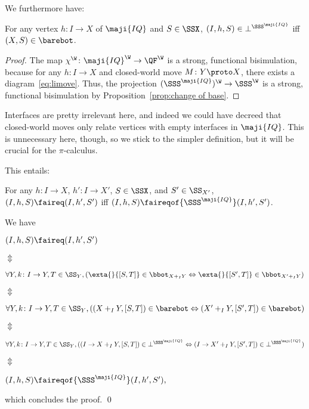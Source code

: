 \documentclass{LMCS}
\renewcommand{\QFI}{\maji{IQ}}
\renewcommand{\LLL}{\QFI}
\renewcommand{\SSSL}{\SSS^{\LLL}}
\theoremstyle{plain}\newtheorem{satz}[thm]{Satz}
\begin{document}
We furthermore have:
\begin{lem}\label{lem:barebat:botL}
  For any vertex $h \colon I \to X$ of $\LLL$ and
  $S \in \SSX$, $(I,h,S) \in \bot^{\SSSL}$ iff $(X,S) \in \barebot$.
\end{lem}
\begin{proof}
  The map $\chi^\W \colon \LLL^\W \to \QF^\W$ is a strong, functional bisimulation,
  because for any $h \colon I \to X$ and closed-world move $M \colon Y
  \proto X$, there exists a diagram~\eqref{eq:limove}.  Thus, the
  projection $(\SSSL)^\W \to \SSS^\W$ is a strong, functional bisimulation by
  Proposition~\ref{prop:change of base}.
\end{proof}
\begin{rem}
  Interfaces are pretty irrelevant here, and indeed we could have
  decreed that closed-world moves only relate vertices with empty
  interfaces in $\LLL$. This is unnecessary here, though, so we stick
  to the simpler definition, but it will be crucial for the
  $\pi$-calculus.
\end{rem}

This entails:
\begin{cor}\label{cor:SSSLI}
  For any $h \colon I \to X$, $h' \colon I \to X'$, $S \in \SSX$, and
  $S' \in \SS_{X'}$, $(I,h,S) \faireq (I,h',S')$ iff $(I,h,S)
  \faireqof{\SSSL} (I,h',S')$.
\end{cor}
\proof We have
  \begin{center}
    $(I,h,S) \faireq (I,h',S')$ 
    
      $\Updownarrow$

      $\forall Y, k \colon I \to Y, T \in \SS_Y, (\exta{}{[S,T]} \in \bbot_{X +_I Y} \Leftrightarrow
      \exta{}{[S',T]} \in \bbot_{X' +_I Y})$

      $\Updownarrow$

      $\forall Y, k \colon I \to Y, T \in \SS_Y, ((X +_I Y, {[S,T]}) \in \barebot \Leftrightarrow
      (X' +_I Y, {[S',T]}) \in \barebot)$

      $\Updownarrow$

      $\forall Y, k \colon I \to Y, T \in \SS_Y, ((I \to X +_I Y, {[S,T]}) \in \bot^{\SSSL} \Leftrightarrow
      (I \to X' +_I Y, {[S',T]}) \in \bot^{\SSSL})$

      $\Updownarrow$

      $(I,h,S) \faireqof{\SSSL} (I,h',S'),$
\end{center}
which concludes the proof.
\qed
\end{document}
